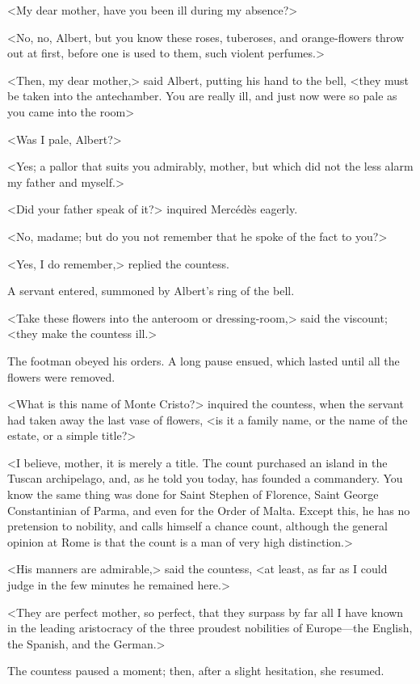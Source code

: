  <My dear mother, have you been ill during my absence?> 

 <No, no, Albert, but you know these roses, tuberoses, and orange-flowers throw out at first, before one is used to them, such violent perfumes.> 

 <Then, my dear mother,> said Albert, putting his hand to the bell, <they must be taken into the antechamber. You are really ill, and just now were so pale as you came into the room\longdash> 

 <Was I pale, Albert?> 

 <Yes; a pallor that suits you admirably, mother, but which did not the less alarm my father and myself.> 

 <Did your father speak of it?> inquired Mercédès eagerly. 

 <No, madame; but do you not remember that he spoke of the fact to you?>

<Yes, I do remember,> replied the countess. 

 A servant entered, summoned by Albert's ring of the bell. 

 <Take these flowers into the anteroom or dressing-room,> said the viscount; <they make the countess ill.> 

 The footman obeyed his orders. A long pause ensued, which lasted until all the flowers were removed. 

 <What is this name of Monte Cristo?> inquired the countess, when the servant had taken away the last vase of flowers, <is it a family name, or the name of the estate, or a simple title?> 

 <I believe, mother, it is merely a title. The count purchased an island in the Tuscan archipelago, and, as he told you today, has founded a commandery. You know the same thing was done for Saint Stephen of Florence, Saint George Constantinian of Parma, and even for the Order of Malta. Except this, he has no pretension to nobility, and calls himself a chance count, although the general opinion at Rome is that the count is a man of very high distinction.> 

 <His manners are admirable,> said the countess, <at least, as far as I could judge in the few minutes he remained here.> 

 <They are perfect mother, so perfect, that they surpass by far all I have known in the leading aristocracy of the three proudest nobilities of Europe—the English, the Spanish, and the German.> 

 The countess paused a moment; then, after a slight hesitation, she resumed. 

